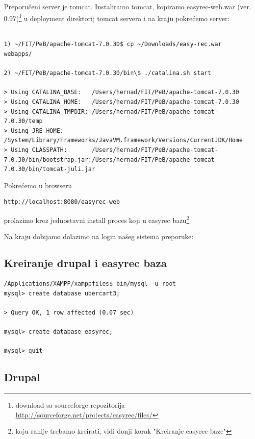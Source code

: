 \documentclass[times, utf8, seminar]{fit}
\begin{document}
{{{Preporučeni server je tomcat. Instaliramo tomcat, kopiramo easyrec-web.war (ver. 0.97)\footnote{download sa sourceforge repozitorija \url{http://sourceforge.net/projects/easyrec/files/}} u deployment direktorij tomcat servera i na kraju pokrećemo server:

\begin{lstlisting}

1) ~/FIT/PeB/apache-tomcat-7.0.30$ cp ~/Downloads/easy-rec.war webapps/

2) ~/FIT/PeB/apache-tomcat-7.0.30/bin\$ ./catalina.sh start

> Using CATALINA_BASE:   /Users/hernad/FIT/PeB/apache-tomcat-7.0.30
> Using CATALINA_HOME:   /Users/hernad/FIT/PeB/apache-tomcat-7.0.30
> Using CATALINA_TMPDIR: /Users/hernad/FIT/PeB/apache-tomcat-7.0.30/temp
> Using JRE_HOME:        /System/Library/Frameworks/JavaVM.framework/Versions/CurrentJDK/Home
> Using CLASSPATH:       /Users/hernad/FIT/PeB/apache-tomcat-7.0.30/bin/bootstrap.jar:/Users/hernad/FIT/PeB/apache-tomcat-7.0.30/bin/tomcat-juli.jar
\end{lstlisting}

Pokrećemo u browseru 

\begin{lstlisting}
http://localhost:8080/easyrec-web
\end{lstlisting}

prolazimo kroz jednostavni install proces koji u easyrec bazu\footnote{koju ranije trebamo kreirati, vidi donji korak "Kreiranje easyrec baze"} 

Na kraju dobijamo dolazimo na login našeg sistema preporuke:

\subsection{Kreiranje drupal i easyrec baza}

\begin{lstlisting}
/Applications/XAMPP/xamppfiles$ bin/mysql -u root
mysql> create database ubercart3;

> Query OK, 1 row affected (0.07 sec)

mysql> create database easyrec;

mysql> quit

\end{lstlisting}

\subsection{Drupal}

}}}
\end{document}
